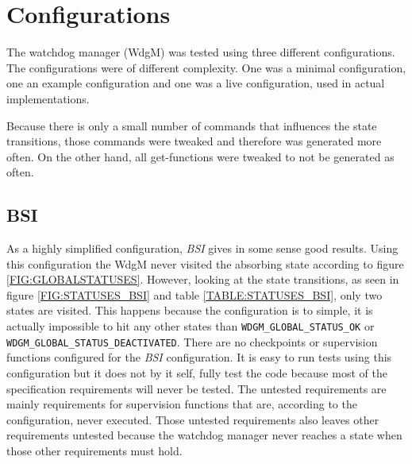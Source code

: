 \section{Configurations}
The watchdog manager (WdgM) was tested using three different
configurations. The configurations were of different complexity. One
was a minimal configuration, one an example configuration and one was
a live configuration, used in actual implementations.

Because there is only a small number of commands that influences the
state transitions, those commands were tweaked and therefore was
generated more often. On the other hand, all get-functions were
tweaked to not be generated as often.

\subsection{BSI}
As a highly simplified configuration, \emph{BSI} gives in some sense
good results.  Using this configuration the WdgM never visited the
absorbing state according to figure \ref{FIG:GLOBALSTATUSES}. However,
looking at the state transitions, as seen in figure
\ref{FIG:STATUSES_BSI} and table \ref{TABLE:STATUSES_BSI}, only two
states are visited. This happens because the configuration is to
simple, it is actually impossible to hit any other states than
\lstinline!WDGM_GLOBAL_STATUS_OK! or
\lstinline!WDGM_GLOBAL_STATUS_DEACTIVATED!. There are no checkpoints
or supervision functions configured for the \emph{BSI} configuration.
It is easy to run tests using this configuration but it does not by it
self, fully test the code because most of the specification
requirements will never be tested. The untested requirements are
mainly requirements for supervision functions that are, according to
the configuration, never executed. Those untested requirements also
leaves other requirements untested because the watchdog manager never
reaches a state when those other requirements must hold.


